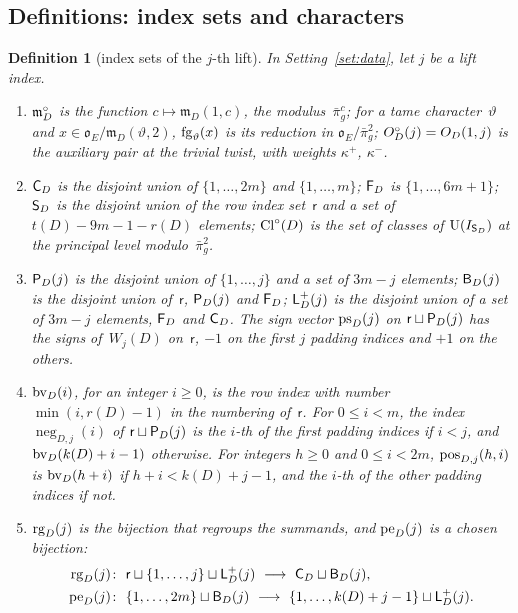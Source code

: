 \documentclass[11pt,a4paper]{article}
\newcommand{\m}[1]{\mbox{$#1$}}        %
\theoremstyle{plainx}
\theoremstyle{uprightx}
\newtheorem{definition}[theorem]{Definition}
\newcommand{\ix}[1]{\mathsf{#1}}
\newcommand{\OEr}{\mathfrak{o}_E}
\newcommand{\UU}{\mathrm{U}}
\newcommand{\negIx}[2]{\operatorname{neg}_{D,#1}(#2)}
\begin{document}
\subsection*{Definitions: index sets and characters}
\begin{definition}[index sets of the $j$-th lift]\label{d:index}
In Setting~\ref{set:data}, let $j$ be a lift index.
\begin{enumerate}[label=\textup{(\arabic*)},leftmargin=2.3em,itemsep=2pt]
\item \m{\untwistedModulus{D}} is the function \m{c\mapsto\mathfrak{m}_D(1,c)}, the modulus~\m{\bar\pi_g^{c}}; for a tame
character~$\vartheta$ and \m{x\in\OEr/\mathfrak{m}_D(\vartheta,2)}, \m{\forgetTwist{\vartheta}{x}} is its reduction in
\m{\OEr/\bar\pi_g^{2}}; \m{\untwistedAuxPair{j}=O_D(1,j)} is the auxiliary pair at the trivial twist, with weights
\m{\kappa^{+}}, \m{\kappa^{-}}.
\item \m{\CarrierIndex{D}} is the disjoint union of \m{\{1,\dots,2m\}} and \m{\{1,\dots,m\}}; \m{\FlatIndex{D}} is
\m{\{1,\dots,6m+1\}}; \m{\SmallIndex{D}} is the disjoint union of the row index set~$\ix r$ and a set of
\m{t(D)-9m-1-r(D)} elements; \m{\SmallClasses{D}} is the set of classes of \m{\UU(I_{\SmallIndex{D}})} at the principal
level modulo~\m{\bar\pi_g^{2}}.
\item \m{\PadIndex{j}} is the disjoint union of \m{\{1,\dots,j\}} and a set of \m{3m-j} elements;
\m{\BigIndex{j}} is the disjoint union of~$\ix r$, \m{\PadIndex{j}} and \m{\FlatIndex{D}}; \m{\LPlusIndex{j}} is the
disjoint union of a set of \m{3m-j} elements, \m{\FlatIndex{D}} and \m{\CarrierIndex{D}}. The sign vector
\m{\padSigns{j}} on \m{\ix r\sqcup\PadIndex{j}} has the signs of~$W_j(D)$ on~$\ix r$, $-1$ on the first $j$ padding
indices and $+1$ on the others.
\item \m{\basisVec{D}{i}}, for an integer \m{i\ge0}, is the row index with number \m{\min(i,r(D)-1)} in the
numbering of~$\ix r$. For \m{0\le i<m}, the index \m{\negIx{j}{i}} of \m{\ix r\sqcup\PadIndex{j}} is the $i$-th of
the first padding indices if \m{i<j}, and \m{\basisVec{D}{k(D)+i-1}} otherwise. For integers \m{h\ge0} and
\m{0\le i<2m}, \m{\posRowIndex{j}{h}{i}} is \m{\basisVec{D}{h+i}} if \m{h+i<k(D)+j-1}, and the $i$-th of the other
padding indices if not.
\item \m{\regroupEquiv{j}} is the bijection that regroups the summands, and \m{\posEquiv{j}} is a chosen bijection:
\begin{align*}
\regroupEquiv{j}&\colon\ \ix r\sqcup\{1,\dots,j\}\sqcup\LPlusIndex{j}\ \longrightarrow\ \CarrierIndex{D}\sqcup\BigIndex{j},\\
\posEquiv{j}&\colon\ \{1,\dots,2m\}\sqcup\BigIndex{j}\ \longrightarrow\ \{1,\dots,k(D)+j-1\}\sqcup\LPlusIndex{j}.
\end{align*}
\end{enumerate}
\end{definition}
\end{document}
